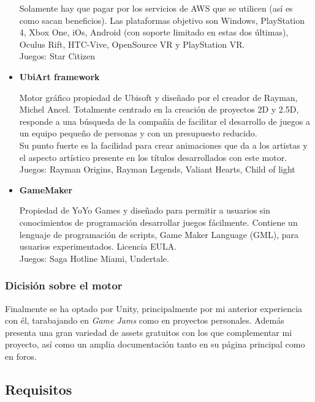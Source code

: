 \begin{itemize}
\quad Solamente hay que pagar por los servicios de AWS que se utilicen (así es como sacan beneficios). Las plataformas objetivo son Windows, PlayStation 4, Xbox One, iOs, Android (con soporte limitado en estas dos últimas), Oculus Rift, HTC-Vive, OpenSource VR y PlayStation VR.\\

\quad Juegos: Star Citizen\\

\item{\textbf{UbiArt framework}}

\quad Motor gráfico propiedad de Ubisoft y diseñado por el creador de Rayman, Michel Ancel. Totalmente centrado en la creación de proyectos 2D y 2.5D, responde a una
búsqueda de la compañía de facilitar el desarrollo de juegos a un equipo pequeño de personas y con un presupuesto reducido.\\

\quad Su punto fuerte es la facilidad para crear animaciones que da a los artistas y el aspecto artístico presente en los títulos desarrollados con este motor.\\

\quad Juegos: Rayman Origins, Rayman Legends, Valiant Hearts, Child of light \\

\item{\textbf{GameMaker}}

\quad Propiedad de YoYo Games y diseñado para permitir a usuarios sin conocimientos de programación desarrollar juegos fácilmente. Contiene un lenguaje de programación de scripts, Game Maker Language (GML), para usuarios experimentados. Licencia EULA.\\

\quad Juegos: Saga Hotline Miami, Undertale.\\
\end{itemize}

\subsubsection{Dicisión sobre el motor}
\quad Finalmente se ha optado por Unity, principalmente por mi anterior experiencia con él, tarabajando en \textit{Game Jams} como en proyectos personales. Además presenta una gran variedad de assets gratuitos con los que complementar mi proyecto, así como un amplia documentación tanto en su página principal como en foros.

\subsection{Requisitos}
